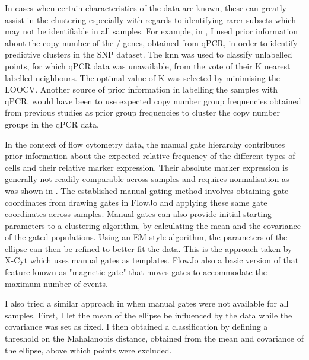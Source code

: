 In cases when certain characteristics of the data are known, these can greatly assist in the clustering especially with regards to identifying rarer subsets which may not be identifiable in all samples.
For example, in , I used prior information about the copy number of the / genes, obtained from qPCR, in order to identify predictive clusters in the SNP dataset.
The \gls{knn} was used to classify unlabelled points, for which qPCR data was unavailable, from the vote of their K nearest labelled neighbours.
The optimal value of K was selected by minimising the \gls{LOOCV}.
Another source of prior information in labelling the samples with qPCR, would have been to use expected copy number group frequencies obtained from previous studies \citep{Jiang:2012cf} as prior group frequencies to cluster the copy number groups in the qPCR data.

In the context of flow cytometry data, the manual gate hierarchy contributes prior information about the expected relative frequency of the different types of cells and their relative marker expression.
Their absolute marker expression is generally not readily comparable across samples and requires normalisation as was shown in .
The established manual gating method involves obtaining gate coordinates from drawing gates in FlowJo and applying these same
gate coordinates across samples.
Manual gates can also provide initial starting parameters to a clustering algorithm,
by calculating the mean and the covariance of the gated populations.
Using an EM style algorithm, the parameters of the ellipse can then be refined to better fit the data.
This is the approach taken by X-Cyt \citep{Hu:2013bg} which uses manual gates as templates.
FlowJo also a basic version of that feature known as "magnetic gate" that moves gates to accommodate the maximum number of events.

I also tried a similar approach in  when manual gates were not available for all samples.
First, I let the mean of the ellipse be influenced by the data while the covariance was set as fixed.
I then obtained a classification by defining a threshold on the Mahalanobis distance, obtained from the mean and covariance of the ellipse, above which points were excluded.

